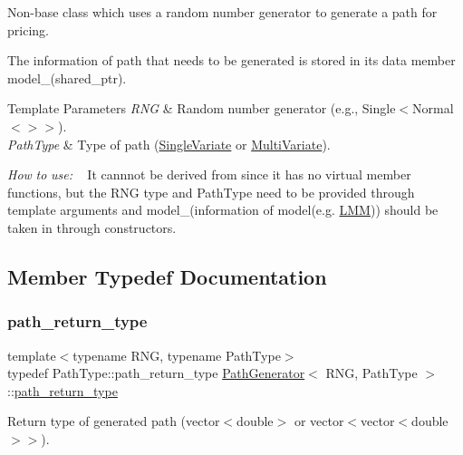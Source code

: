 Non-\/base class which uses a random number generator to generate a path for pricing. 

The information of path that needs to be generated is stored in its data member model\+\_\+(shared\+\_\+ptr).~\newline

\begin{DoxyTemplParams}{Template Parameters}
{\em R\+NG} & Random number generator (e.\+g., Single$<$Normal$<$$>$$>$). \\
\hline
{\em Path\+Type} & Type of path (\hyperlink{struct_single_variate}{Single\+Variate} or \hyperlink{struct_multi_variate}{Multi\+Variate}).\\
\hline
\end{DoxyTemplParams}
{\itshape How} {\itshape to} {\itshape use\+:} ~\newline
It cannnot be derived from since it has no virtual member functions, but the R\+NG type and Path\+Type need to be provided through template arguments and model\+\_\+(information of model(e.\+g. \hyperlink{class_l_m_m}{L\+MM})) should be taken in through constructors. 

\subsection{Member Typedef Documentation}
\hypertarget{class_path_generator_a7c8e36c418bdb1d8e99c44ac75a5e02a}{}\label{class_path_generator_a7c8e36c418bdb1d8e99c44ac75a5e02a} 
\subsubsection{\texorpdfstring{path\+\_\+return\+\_\+type}{path\_return\_type}}
{\footnotesize\ttfamily template$<$typename R\+NG, typename Path\+Type$>$ \\
typedef Path\+Type\+::path\+\_\+return\+\_\+type \hyperlink{class_path_generator}{Path\+Generator}$<$ R\+NG, Path\+Type $>$\+::\hyperlink{class_path_generator_a7c8e36c418bdb1d8e99c44ac75a5e02a}{path\+\_\+return\+\_\+type}}



Return type of generated path (vector$<$double$>$ or vector$<$vector$<$double$>$$>$). 

\hypertarget{class_path_generator_a467bc3ddaa5e9104170550617e767349}{}\label{class_path_generator_a467bc3ddaa5e9104170550617e767349} 

